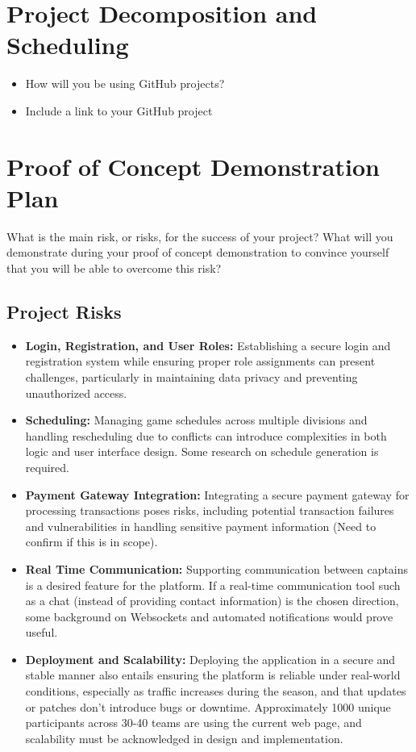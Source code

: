 \documentclass{article}
\begin{document}
\section{Project Decomposition and Scheduling}

\begin{itemize}
  \item How will you be using GitHub projects?
  \item Include a link to your GitHub project
\end{itemize}


\section{Proof of Concept Demonstration Plan}

What is the main risk, or risks, for the success of your project?  What will you
demonstrate during your proof of concept demonstration to convince yourself that
you will be able to overcome this risk?

\subsection{Project Risks}

\begin{itemize}
  \item \textbf{Login, Registration, and User Roles:} Establishing a secure login and registration system while ensuring proper role assignments can present challenges, particularly in maintaining data privacy and preventing unauthorized access.
  \item \textbf{Scheduling:} Managing game schedules across multiple divisions and handling rescheduling due to conflicts can introduce complexities in both logic and user interface design. Some research on schedule generation is required.
  \item \textbf{Payment Gateway Integration:} Integrating a secure payment gateway for processing transactions poses risks, including potential transaction failures and vulnerabilities in handling sensitive payment information (Need to confirm if this is in scope).
  \item \textbf{Real Time Communication:} Supporting communication between captains is a desired feature for the platform. If a real-time communication tool such as a chat (instead of providing contact information) is the chosen direction, some background on Websockets and automated notifications would prove useful.
  \item \textbf{Deployment and Scalability:} Deploying the application in a secure and stable manner also entails ensuring the platform is reliable under real-world conditions, especially as traffic increases during the season, and that updates or patches don’t introduce bugs or downtime. Approximately 1000 unique participants across 30-40 teams are using the current web page, and scalability must be acknowledged in design and implementation.
\end{itemize}
\end{document}
